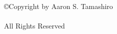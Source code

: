 
\thispagestyle{empty}

\belowSecSkip

\vspace*{2.5in}

\begin{center}
	\copyright Copyright by Aaron S. Tamashiro \\
	\myDefenseDate \\
	All Rights Reserved
\end{center}


